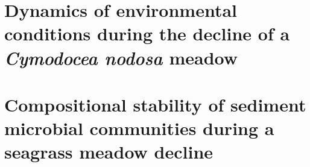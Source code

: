 \documentclass[
  12 pt,
]{book}
\begin{document}
\clearpage

\pagestyle{plain}

\vspace*{0pt}

\hypertarget{section-najdek-et-al-2020}{%
\section{\texorpdfstring{Dynamics of environmental conditions during the decline of a \emph{Cymodocea nodosa} meadow}{Dynamics of environmental conditions during the decline of a Cymodocea nodosa meadow}}\label{section-najdek-et-al-2020}}

\clearpage

\pagestyle{mainbackmatter}



\pagestyle{plain}

\vspace*{0pt}

\hypertarget{section-markovski-et-al-2022}{%
\section{Compositional stability of sediment microbial communities during a seagrass meadow decline}\label{section-markovski-et-al-2022}}

\clearpage

\pagestyle{mainbackmatter}



\pagestyle{plain}

\vspace*{0pt}
\end{document}
